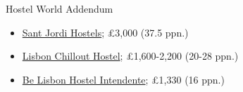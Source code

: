 \documentclass[12pt]{article}
\newcommand{\cost}[2]{\pounds#1 (#2 ppn.)}
\begin{document}
	Hostel World Addendum
	
	\begin{itemize}
		\item \href{https://www.hostelworld.com/pwa/hosteldetails.php/Sant-Jordi-Hostels-Lisbon/Lisbon/266600?from=2022-05-28&to=2022-06-05&guests=10&groupType=4&groupAgeRange=3}{Sant Jordi Hostels}; \cost{3,000}{37.5}
		\item 
		\href{https://www.hostelworld.com/pwa/hosteldetails.php/Lisbon-Chillout-Hostel/Lisbon/29603?from=2022-05-28&to=2022-06-05&guests=10&groupType=4&groupAgeRange=3}{Lisbon Chillout Hostel}; \cost{1,600-2,200}{20-28}
		\item 
		\href{https://www.hostelworld.com/pwa/hosteldetails.php/Be-Lisbon-Hostel-Intendente/Lisbon/296878?from=2022-05-28&to=2022-06-05&guests=10&groupType=4&groupAgeRange=3}{Be Lisbon Hostel Intendente}; \cost{1,330}{16}
	\end{itemize}
	
\end{document}
